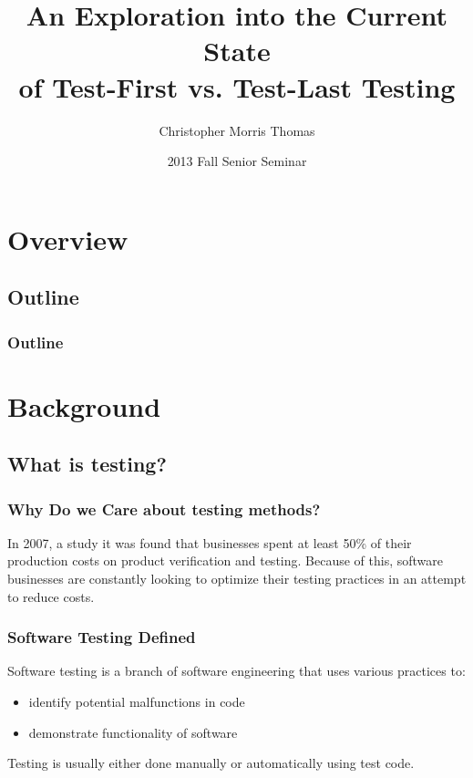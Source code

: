 \documentclass{beamer}
\title[Test-First vs. Test-Last Testing]{An Exploration into the Current State \\ of Test-First vs. Test-Last Testing}
\author[Thomas]{Christopher Morris Thomas}
\institute[U of Minn, Morris]
{
  Division of Science and Mathematics \\
  University of Minnesota, Morris \\
  Morris, Minnesota, USA
}
\date[2013 Fall Senior Seminar] %
{2013 Fall Senior Seminar}
\newcommand{\linespace}{\vskip 0.25cm}
\begin{document}
\begin{frame}
  \titlepage
\end{frame}


\section*{Overview}

\subsection*{Outline}

\begin{frame}
  \frametitle{Outline}
  \tableofcontents[hideallsubsections]
\end{frame}

\section[Background]{Background}
\subsection{What is testing?}
\begin{frame}
\frametitle{Why Do we Care about testing methods?}
In 2007, a study it was found that businesses spent at least 50\% of their production costs on product verification and testing.
\linespace
\linespace
Because of this, software businesses are constantly looking to optimize their testing practices in an attempt to reduce costs.
\end{frame}

\begin{frame}
\frametitle{Software Testing Defined}
Software testing is a branch of software
engineering that uses various practices to:
\begin{itemize}
\item identify potential malfunctions in code
\item demonstrate functionality of software
\end{itemize}
\linespace
Testing is usually either done manually or automatically using test code.
\end{frame}
\end{document}
